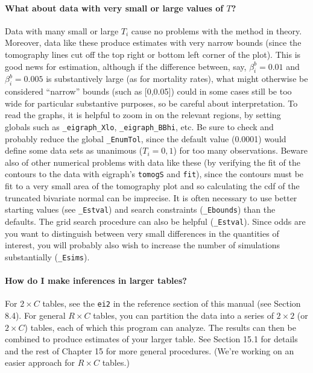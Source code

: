 \documentclass[11pt,titlepage]{article}
\begin{document}
\paragraph{What about data with very small or large values of $T$?}
Data with many small or large $T_i$ cause no problems with the method
in theory.  Moreover, data like these produce estimates with very
narrow bounds (since the tomography lines cut off the top right or
bottom left corner of the plot).  This is good news for estimation,
although if the difference between, say, $\beta_i^b=0.01$ and
$\beta_i^b=0.005$ is substantively large (as for mortality rates),
what might otherwise be considered ``narrow'' bounds (such as
[0,0.05]) could in some cases still be too wide for particular
substantive purposes, so be careful about interpretation.  To read the
graphs, it is helpful to zoom in on the relevant regions, by setting
globals such as \texttt{\_eigraph\_Xlo}, \texttt{\_eigraph\_BBhi},
etc.  Be sure to check and probably reduce the global
\texttt{\_EnumTol}, since the default value (0.0001) would define some
data sets as unanimous ($T_i=0,1$) for too many observations.  Beware
also of other numerical problems with data like these (by verifying
the fit of the contours to the data with eigraph's \texttt{tomogS} and
\texttt{fit}), since the contours must be fit to a very small area of
the tomography plot and so calculating the cdf of the truncated
bivariate normal can be imprecise.  It is often necessary to use
better starting values (see \texttt{\_Estval}) and search constraints
(\texttt{\_Ebounds}) than the defaults.  The grid search procedure can
also be helpful (\texttt{\_Estval}).  Since odds are you want to
distinguish between very small differences in the quantities of
interest, you will probably also wish to increase the number of
simulations substantially (\texttt{\_Esims}).

\paragraph{How do I make inferences in larger tables?}
For $2\times C$ tables, see the \texttt{ei2} in the reference section
of this manual (see Section 8.4).  For general $R\times C$ tables, you
can partition the data into a series of $2\times 2$ (or $2\times C$)
tables, each of which this program can analyze.  The results can then
be combined to produce estimates of your larger table.  See Section
15.1 for details and the rest of Chapter 15 for more general
procedures.  (We're working on an easier approach for $R\times C$
tables.)
\end{document}
